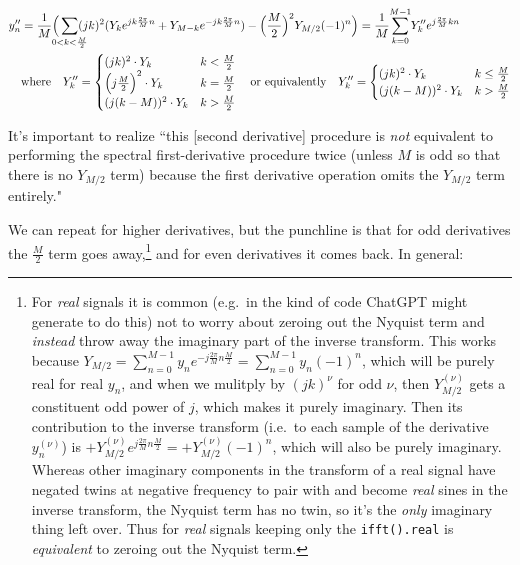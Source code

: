 \documentclass[10pt]{article}
\begin{document}
\begin{align*}
y''_n &= \frac{1}{M} \Big( \sum_{\mathclap{0 < k < \frac{M}{2}}} (jk)^2 (Y_k e^{j k \frac{2\pi}{M}n} + Y_{M-k} e^{-j k \frac{2\pi}{M}n}) - \Big(\frac{M}{2}\Big)^2 Y_{M/2} (-1)^n \Big) = \frac{1}{M} \sum_{k = 0}^{\mathclap{M-1}} Y''_k e^{j\frac{2\pi}{M}kn} \\
& \text{where} \quad Y''_k = \begin{cases} (j k)^2 \cdot Y_k & k < \frac{M}{2} \\ \Big(j\frac{M}{2}\Big)^2 \cdot Y_k & k = \frac{M}{2} \\ (j(k - M))^2 \cdot Y_k & k > \frac{M}{2} \end{cases} \quad \text{or equivalently} \quad Y''_k = \begin{cases} (j k)^2 \cdot Y_k & k \leq \frac{M}{2} \\ (j(k - M))^2 \cdot Y_k & k > \frac{M}{2} \end{cases}
\end{align*}

It's important to realize ``this [second derivative] procedure is \textit{not} equivalent to performing the spectral first-derivative procedure twice (unless $M$ is odd so that there is no $Y_{M/2}$ term) because the first derivative operation omits the $Y_{M/2}$ term entirely."\cite{johnson}

We can repeat for higher derivatives, but the punchline is that for odd derivatives the $\frac{M}{2}$ term goes away,\footnote{For \textit{real} signals it is common (e.g.~in the kind of code ChatGPT might generate to do this) not to worry about zeroing out the Nyquist term and \textit{instead} throw away the imaginary part of the inverse transform. This works because $Y_{M/2} = \sum_{n=0}^{M-1} y_n e^{-j\frac{2\pi}{M} n \frac{M}{2}} = \sum_{n=0}^{M-1} y_n (-1)^n$, which will be purely real for real $y_n$, and when we mulitply by $(jk)^\nu$ for odd $\nu$, then $Y_{M/2}^{(\nu)}$ gets a constituent odd power of $j$, which makes it purely imaginary. Then its contribution to the inverse transform (i.e.~to each sample of the derivative $y_n^{(\nu)}$) is $+Y_{M/2}^{(\nu)} e^{j\frac{2\pi}{M}n\frac{M}{2}} = +Y_{M/2}^{(\nu)} (-1)^n$, which will also be purely imaginary. Whereas other imaginary components in the transform of a real signal have negated twins at negative frequency to pair with and become \textit{real} sines in the inverse transform, the Nyquist term has no twin, so it's the \textit{only} imaginary thing left over. Thus for \textit{real} signals keeping only the \texttt{ifft().real} is \textit{equivalent} to zeroing out the Nyquist term.} and for even derivatives it comes back. In general:
\end{document}
